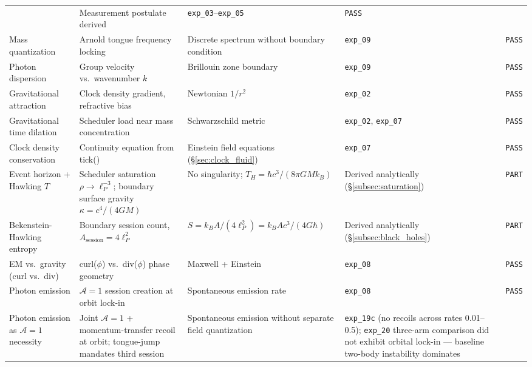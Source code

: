 {\begin{longtable}{@{}p{2.6cm}p{3.8cm}p{3.2cm}p{4.4cm}p{1.0cm}@{}}
    & Measurement postulate derived
    & \texttt{exp\_03}--\texttt{exp\_05}
    & \texttt{PASS} \\
Mass quantization
    & Arnold tongue frequency locking
    & Discrete spectrum without boundary condition
    & \texttt{exp\_09}
    & \texttt{PASS} \\
Photon dispersion
    & Group velocity vs.\ wavenumber $k$
    & Brillouin zone boundary
    & \texttt{exp\_09}
    & \texttt{PASS} \\
\hline
Gravitational attraction
    & Clock density gradient, refractive bias
    & Newtonian $1/r^2$
    & \texttt{exp\_02}
    & \texttt{PASS} \\
Gravitational time dilation
    & Scheduler load near mass concentration
    & Schwarzschild metric
    & \texttt{exp\_02}, \texttt{exp\_07}
    & \texttt{PASS} \\
Clock density conservation
    & Continuity equation from tick()
    & Einstein field equations (§\ref{sec:clock_fluid})
    & \texttt{exp\_07}
    & \texttt{PASS} \\
Event horizon + Hawking $T$
    & Scheduler saturation $\rho \to \ell_P^{-3}$;
      boundary surface gravity $\kappa = c^4/(4GM)$
    & No singularity; $T_H = \hbar c^3/(8\pi G M k_B)$
    & Derived analytically (§\ref{subsec:saturation})
    & \texttt{PART} \\
Bekenstein-Hawking entropy
    & Boundary session count, $A_\text{session} = 4\ell_P^2$
    & $S = k_B A/(4\ell_P^2) = k_B A c^3/(4G\hbar)$
    & Derived analytically (§\ref{subsec:black_holes})
    & \texttt{PART} \\
\hline
EM vs.\ gravity (curl vs.\ div)
    & curl($\phi$) vs.\ div($\phi$) phase geometry
    & Maxwell + Einstein
    & \texttt{exp\_08}
    & \texttt{PASS} \\
Photon emission
    & $\mathcal{A}=1$ session creation at orbit lock-in
    & Spontaneous emission rate
    & \texttt{exp\_08}
    & \texttt{PASS} \\
Photon emission as $\mathcal{A}=1$ necessity
    & Joint $\mathcal{A}=1$ + momentum-transfer recoil at orbit;
      tongue-jump mandates third session
    & Spontaneous emission without separate field quantization
    & \texttt{exp\_19c} (no recoils across rates 0.01--0.5);
      \texttt{exp\_20} three-arm comparison did not exhibit orbital
      lock-in --- baseline two-body instability dominates

\end{longtable}}
